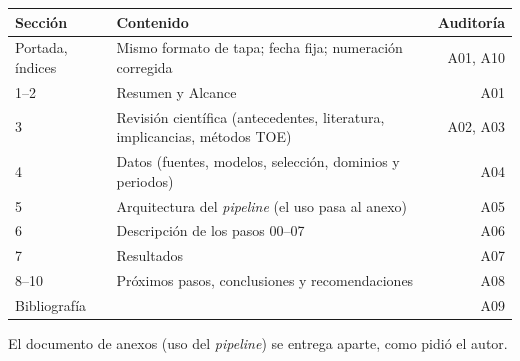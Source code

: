 \begin{center}\small
\begin{tabular}{@{}lL{7.5cm}r@{}}
\toprule
Sección & Contenido & Auditoría \\
\midrule
Portada, índices & Mismo formato de tapa; fecha fija; numeración corregida & A01, A10 \\
1--2 & Resumen y Alcance & A01 \\
3 & Revisión científica (antecedentes, literatura, implicancias, métodos TOE) & A02, A03 \\
4 & Datos (fuentes, modelos, selección, dominios y periodos) & A04 \\
5 & Arquitectura del \emph{pipeline} (el uso pasa al anexo) & A05 \\
6 & Descripción de los pasos 00--07 & A06 \\
7 & Resultados & A07 \\
8--10 & Próximos pasos, conclusiones y recomendaciones & A08 \\
Bibliografía &  & A09 \\
\bottomrule
\end{tabular}
\end{center}

El documento de anexos (uso del \emph{pipeline}) se entrega aparte, como pidió el autor.


